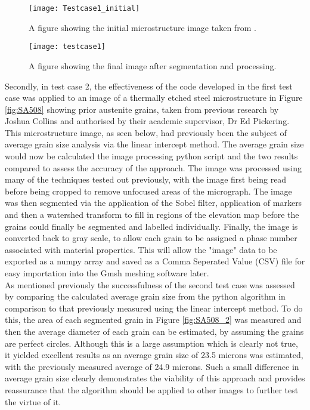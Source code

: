 \documentclass[\report.tex]{subfiles}
\begin{document}
\begin{figure}[!htb]
  \centering
  \begin{minipage}[!htb]{.5\textwidth}
    \centering\captionsetup{width=.8\linewidth}%
    \texttt{[image: Testcase1\_initial]}
    \caption{A figure showing the initial microstructure image taken from \cite{CallisterJrWilliamD2000MSaE}.}\label{fig:Testcase1}
  \end{minipage}%
  \begin{minipage}[!htb]{.5\textwidth}
    \centering\captionsetup{width=.8\linewidth}%
    \texttt{[image: testcase1]}
    \caption{A figure showing the final image after segmentation and processing.}
    \label{fig:Testcase1_2}
  \end{minipage}
\end{figure}

\pagebreak
\noindent Secondly, in test case 2, the effectiveness of the code developed in the first test case was applied to an image of a thermally etched steel microstructure in Figure \ref{fig:SA508} showing prior austenite grains, taken from previous research by Joshua Collins and authorised by their academic supervisor, Dr Ed Pickering. This microstructure image, as seen below, had previously been the subject of average grain size analysis via the linear intercept method. The average grain size would now be calculated the image processing python script and the two results compared to assess the accuracy of the approach. The image was processed using many of the techniques tested out previously, with the image first being read before being cropped to remove unfocused areas of the micrograph. The image was then segmented via the application of the Sobel filter, application of markers and then a watershed transform to fill in regions of the elevation map before the grains could finally be segmented and labelled individually. Finally, the image is converted back to gray scale, to allow each grain to be assigned a phase number associated with material properties. This will allow the "image" data to be exported as a numpy array and saved as a Comma Seperated Value (CSV) file for easy importation into the Gmsh meshing software later.\\

\noindent As mentioned previously the successfulness of the second test case was assessed by comparing the calculated average grain size from the python algorithm in comparison to that previously measured using the linear intercept method. To do this, the area of each segmented grain in Figure \ref{fig:SA508_2} was measured and then the average diameter of each grain can be estimated, by assuming the grains are perfect circles. Although this is a large assumption which is clearly not true, it yielded excellent results as an average grain size of 23.5 microns was estimated, with the previously measured average of 24.9 microns. Such a small difference in average grain size clearly demonstrates the viability of this approach and provides reassurance that the algorithm should be applied to other images to further test the virtue of it.\\
\end{document}
